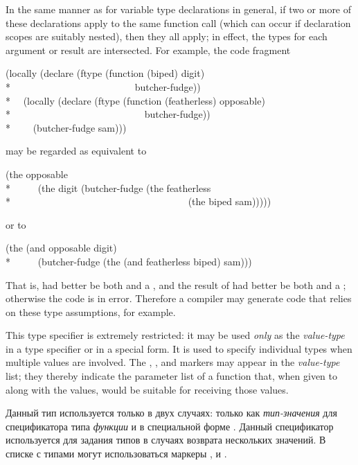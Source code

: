 \begin{flushdesc}
\begin{new}
In the same manner as for variable type declarations in general,
if two or more
of these declarations apply to the same function call (which can
occur if declaration scopes are suitably nested), then they all apply;
in effect, the types for each argument or result are intersected.
For example, the code fragment
\begin{lisp}
(locally (declare (ftype (function (biped) digit) \\*
~~~~~~~~~~~~~~~~~~~~~~~~~butcher-fudge)) \\*
~~(locally (declare (ftype (function (featherless) opposable) \\*
~~~~~~~~~~~~~~~~~~~~~~~~~~~butcher-fudge)) \\*
~~~~(butcher-fudge sam)))
\end{lisp}
may be regarded as equivalent to
\begin{lisp}
(the opposable \\*
~~~~~(the digit (butcher-fudge (the featherless \\*
~~~~~~~~~~~~~~~~~~~~~~~~~~~~~~~~~~~~(the biped sam)))))
\end{lisp}
or to
\begin{lisp}
(the (and opposable digit) \\*
~~~~~(butcher-fudge (the (and featherless biped) sam)))
\end{lisp}
That is,  had better be both  and a ,
and the result of  had better be both
 and a ; otherwise the code is in error.
Therefore a compiler may generate code that relies on these type assumptions,
for example.
\end{new}


\item[\cd{(values \textit{value1-type} \textit{value2-type} ...)}]
This type specifier is extremely restricted: it may be used \textit{only}
as the \textit{value-type} in a  type specifier or in
a  special form.  It is used to specify individual types when
multiple values are involved.
The
, , and  markers may appear in the \textit{value-type} list;
they thereby indicate the parameter list of a
function that, when given to  along with
the values, would be suitable for receiving those values.

\item[\cd{(values \textit{тип-значения-1} \textit{тип-значения-2} ...)}]
Данный тип используется только в двух случаях: только как \textit{тип-значения}
для спецификатора типа \textit{функции} и в специальной форме . Данный
спецификатор используется для задания типов в случаях возврата нескольких
значений.
В списке с типами могут использоваться маркеры ,  и .
\end{flushdesc}


